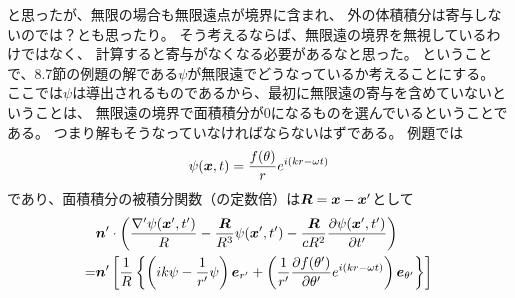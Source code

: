 \documentclass[a4paper, 10pt]{jsarticle}
\theoremstyle{definition}
\def\vec#1{\mbox{\boldmath $#1$}}
\newcommand{\pdif}[2]{\frac{\partial #1}{\partial #2}}
\begin{document}
と思ったが、無限の場合も無限遠点が境界に含まれ、
外の体積積分は寄与しないのでは？とも思ったり。
そう考えるならば、無限遠の境界を無視しているわけではなく、
計算すると寄与がなくなる必要があるなと思った。
ということで、8.7節の例題の解である$\psi$が無限遠でどうなっているか考えることにする。
ここでは$\psi$は導出されるものであるから、最初に無限遠の寄与を含めていないということは、
無限遠の境界で面積積分が0になるものを選んでいるということである。
つまり解もそうなっていなければならないはずである。
例題では
\begin{align}
	\psi(\vec{x}, t) = \frac{f(\theta)}{r}
	e^{i(kr - \omega t)}
\end{align}
であり、面積積分の被積分関数（の定数倍）は$\vec{R} = \vec{x} - \vec{x}'$として
\begin{align}
	&\vec{n}' \cdot \left( 
		\frac{\nabla'\psi(\vec{x}', t')}{R}
		- \frac{\vec{R}}{R^3} \psi(\vec{x}', t')
		- \frac{\vec{R}}{cR^2} \pdif{\psi(\vec{x}', t')}{t'}
	\right) \\
	=& \vec{n}' \left[
		\frac{1}{R} \left\{
			\left( ik \psi - \frac{1}{r'} \psi \right) \vec{e}_{r'}
			+ \left( \frac{1}{r'} 
			\pdif{f(\theta')}{\theta'} e^{i(kr - \omega t)} \right)
			\vec{e}_{\theta'}
		\right\}
	\right]
\end{align}
\end{document}
